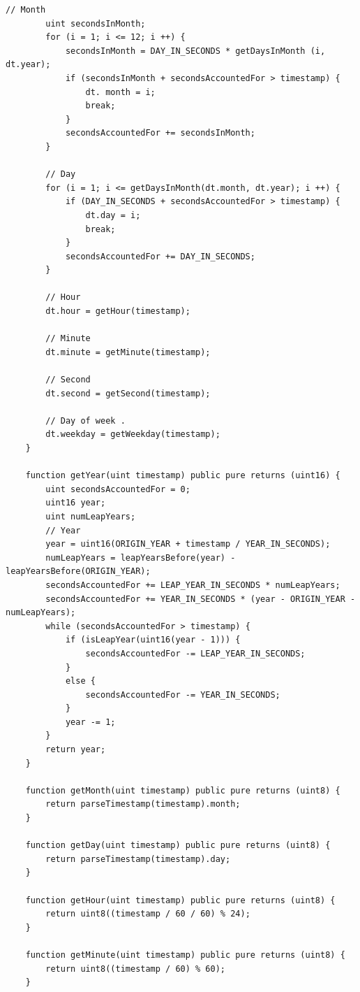 \documentclass[a4paper]{article}
\begin{document}
\begin{frame}
\begin{lstlisting}[basicstyle=\small]
        // Month
        uint secondsInMonth;
        for (i = 1; i <= 12; i ++) {
            secondsInMonth = DAY_IN_SECONDS * getDaysInMonth (i, dt.year);
            if (secondsInMonth + secondsAccountedFor > timestamp) {
                dt. month = i;
                break;
            }
            secondsAccountedFor += secondsInMonth;
        }

        // Day
        for (i = 1; i <= getDaysInMonth(dt.month, dt.year); i ++) {
            if (DAY_IN_SECONDS + secondsAccountedFor > timestamp) {
                dt.day = i;
                break;
            }
            secondsAccountedFor += DAY_IN_SECONDS;
        }

        // Hour
        dt.hour = getHour(timestamp);

        // Minute
        dt.minute = getMinute(timestamp);

        // Second
        dt.second = getSecond(timestamp);

        // Day of week .
        dt.weekday = getWeekday(timestamp);
    }

    function getYear(uint timestamp) public pure returns (uint16) {
        uint secondsAccountedFor = 0;
        uint16 year;
        uint numLeapYears;
        // Year
        year = uint16(ORIGIN_YEAR + timestamp / YEAR_IN_SECONDS);
        numLeapYears = leapYearsBefore(year) - leapYearsBefore(ORIGIN_YEAR);
        secondsAccountedFor += LEAP_YEAR_IN_SECONDS * numLeapYears;
        secondsAccountedFor += YEAR_IN_SECONDS * (year - ORIGIN_YEAR - numLeapYears);
        while (secondsAccountedFor > timestamp) {
            if (isLeapYear(uint16(year - 1))) {
                secondsAccountedFor -= LEAP_YEAR_IN_SECONDS;
            }
            else {
                secondsAccountedFor -= YEAR_IN_SECONDS;
            }
            year -= 1;
        }
        return year;
    }
    
    function getMonth(uint timestamp) public pure returns (uint8) {
        return parseTimestamp(timestamp).month;
    }
    
    function getDay(uint timestamp) public pure returns (uint8) {
        return parseTimestamp(timestamp).day;
    }
    
    function getHour(uint timestamp) public pure returns (uint8) {
        return uint8((timestamp / 60 / 60) % 24);
    }
    
    function getMinute(uint timestamp) public pure returns (uint8) {
        return uint8((timestamp / 60) % 60);
    }
    

\end{lstlisting}
\end{frame}
\end{document}
